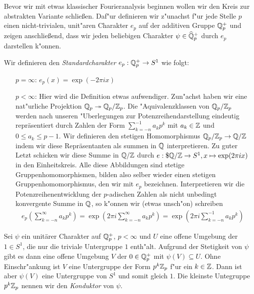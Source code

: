 		Bevor wir mit etwas klassischer Fourieranalysis beginnen wollen wir den Kreis zur abstrakten Variante schließen.
		Daf"ur definieren wir z"unachst f"ur jede Stelle $p$ einen nicht-trivialen, unit"aren Charakter $e_p$ auf der additiven Gruppe $\mathbb{Q}_p^+$ und zeigen anschließend, dass wir jeden beliebigen Charakter $\psi \in \widehat{\mathbb{Q}}_p^+$ durch $e_p$ darstellen k"onnen.
		\begin{defi}
			Wir definieren den \emph{Standardcharakter} $e_p:\mathbb{Q}_p^+ \to S^1$ wie folgt:
			\begin{itemize}
				\item [$p=\infty$:] $e_p(x) = \exp(-2\pi i x)$
				\item [$p<\infty$:] Hier wird die Definition etwas aufwendiger. Zun"achst haben wir eine nat"urliche Projektion ${\mathbb{Q}_p} \twoheadrightarrow {\mathbb{Q}_p}/{\mathbb{Z}_p}$.
				Die "Aquivalenzklassen von ${\mathbb{Q}_p}/{\mathbb{Z}_p}$ werden nach unseren "Uberlegungen zur Potenzreihendarstellung eindeutig repräsentiert durch Zahlen der Form $\sum_{k=-n}^{-1} a_kp^k$ mit $a_k \in \mathbb{Z}$ und $0\leq a_k\leq p-1$.
				Wir definieren den stetigen Homomorphismus ${\mathbb{Q}_p}/{\mathbb{Z}_p} \to \mathbb{Q}/\mathbb{Z}$ indem wir diese Repräsentanten als summen in $\mathbb{Q}$ interpretieren. 
				Zu guter Letzt schicken wir diese Summe in $\mathbb{Q}/\mathbb{Z}$ durch $e: \$\mathbb{Q}/\mathbb{Z} \to S^1, x \mapsto \exp(2\pi i x)$ in den Einheitskreis. 
				Alle diese Abbildungen sind stetige Gruppenhomomorphismen, bilden also selber wieder einen stetigen Gruppenhomomorphismus, den wir mit $e_p$ bezeichnen.
				Interpretieren wir die Potenzreihenentwicklung der $p$-adischen Zahlen als nicht unbedingt konvergente Summe in $\mathbb{Q}$, so k"onnen wir (etwas unsch"on) schreiben
				\begin{align*}
					e_p\left(\sum_{k=-n}^{\infty} a_kp^k\right) = \exp\left(2\pi i \sum_{k=-n}^{\infty} a_kp^k\right) = \exp\left(2\pi i \sum_{k=-n}^{-1} a_kp^k\right)
				\end{align*}
			\end{itemize}
		\end{defi}
		Sei $\psi$ ein unitärer Charakter auf $\mathbb{Q}_p^+$, $p<\infty$ und $U$ eine offene Umgebung der $1 \in S^1$, die nur die triviale Untergruppe $1$ enth"alt. 
		Aufgrund der Stetigkeit von $\psi$ gibt es dann eine offene Umgebung $V$ der $0\in\mathbb{Q}_p^+$ mit $\psi(V)\subseteq U$. 
		Ohne Einschr"ankung ist $V$ eine Untergruppe der Form $p^k{\mathbb{Z}_p}$ f"ur ein $k\in\mathbb{Z}$. 
		Dann ist aber $\psi(V)$ eine Untergruppe von $S^1$ und somit gleich $1$.
		Die kleinste Untegruppe $p^k{\mathbb{Z}_p}$ nennen wir den \emph{Konduktor} von $\psi$.
	
